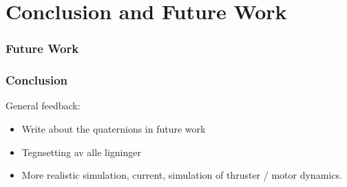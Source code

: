 \chapter{Conclusion and Future Work}

\subsection{Future Work}

\subsection{Conclusion}

{\color{red}
General feedback:
\begin{itemize}
    \item Write about the quaternions in future work
    \item Tegnsetting av alle ligninger
    \item More realistic simulation, current, simulation of thruster / motor dynamics.
\end{itemize}
}
